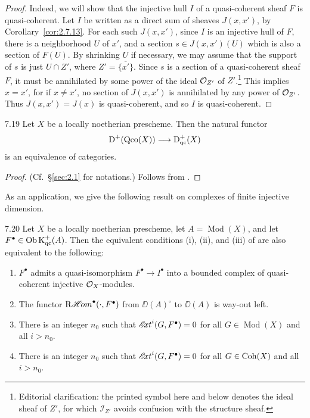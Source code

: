 \begin{proof}
Indeed, we will show that the injective hull $I$ of a quasi-coherent sheaf $F$ is quasi-coherent. Let $I$ be written as a direct sum of sheaves $J(x,x')$, by Corollary~\ref{cor:2.7.13}. For each such $J(x,x')$, since $I$ is an injective hull of $F$, there is a neighborhood $U$ of $x'$, and a section $s\in J(x,x')(U)$ which is also a section of $F(U)$. By shrinking $U$ if necessary, we may assume that the support of $s$ is just $U\cap Z'$, where $Z'=\overline{\{x'\}}$. Since $s$ is a section of a quasi-coherent sheaf $F$, it must be annihilated by some power of the ideal $\mathcal{O}_{Z'}$ of $Z'$.\footnote{Editorial clarification: the printed symbol here and below denotes the ideal sheaf of $Z'$, for which $\mathcal I_{Z'}$ avoids confusion with the structure sheaf.} This implies $x=x'$, for if $x\neq x'$, no section of $J(x,x')$ is annihilated by any power of $\mathcal{O}_{Z'}$. Thus $J(x,x')=J(x)$ is quasi-coherent, and so $I$ is quasi-coherent.
\end{proof}

\begin{bookcorollary}{7.19}\label{cor:2.7.19}
Let $X$ be a locally noetherian prescheme. Then the natural functor
\[
\operatorname{D}^+(\operatorname{Qco}(X)) \longrightarrow \operatorname{D}_{\mathrm{qc}}^+(X)
\]
is an equivalence of categories.
\end{bookcorollary}

\begin{proof}
(Cf.\ \S\ref{sec:2.1} for notations.) Follows from .
\end{proof}

As an application, we give the following result on complexes of finite injective dimension.

\begin{bookproposition}{7.20}\label{prop:2.7.20}
Let $X$ be a locally noetherian prescheme, let $A=\operatorname{Mod}(X)$, and let $F^\bullet\in\operatorname{Ob}\operatorname{K}_{\mathrm{qc}}^+(A)$. Then the equivalent conditions (i), (ii), and (iii) of  are also equivalent to the following:
\begin{enumerate}
\item[(i)${}_{\mathrm{qc}}$] $F^\bullet$ admits a quasi-isomorphism $F^\bullet\to I^\bullet$ into a bounded complex of quasi-coherent injective $\mathcal{O}_X$-modules.
\item[$\underline{(ii)}$] The functor $\mathop{\mathrm{R}\mathscr{H}\!om}\nolimits^\bullet(\cdot,F^\bullet)$ from $\DD(A)^\circ$ to $\DD(A)$ is way-out left.
\item[$\underline{(iii)}$] There is an integer $n_0$ such that $\mathop{\mathscr{E}\!xt}\nolimits^i(G,F^\bullet)=0$ for all $G\in\operatorname{Mod}(X)$ and all $i>n_0$.
\item[$\underline{(iii)}_{\mathrm{c}}$] There is an integer $n_0$ such that $\mathop{\mathscr{E}\!xt}\nolimits^i(G,F^\bullet)=0$ for all $G\in\operatorname{Coh}(X)$ and all $i>n_0$.
\end{enumerate}
\end{bookproposition}

